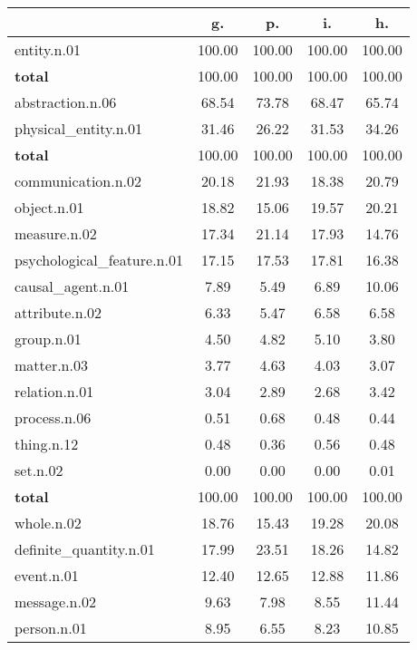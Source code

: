 \begin{table}[h!]
\begin{center}
\begin{tabular}{| l || c | c | c | c |}\hline
 & {\bf g.} & {\bf p.} & {\bf i.} & {\bf h.} \\\hline\hline
entity.n.01 & 100.00  & 100.00  & 100.00  & 100.00 \\\hline\hline
{{\bf total}} & 100.00  & 100.00  & 100.00  & 100.00 \\\hline\hline\hline
abstraction.n.06 & 68.54  & 73.78  & 68.47  & 65.74 \\\hline
physical\_entity.n.01 & 31.46  & 26.22  & 31.53  & 34.26 \\\hline\hline
{{\bf total}} & 100.00  & 100.00  & 100.00  & 100.00 \\\hline\hline\hline
communication.n.02 & 20.18  & 21.93  & 18.38  & 20.79 \\\hline
object.n.01 & 18.82  & 15.06  & 19.57  & 20.21 \\\hline
measure.n.02 & 17.34  & 21.14  & 17.93  & 14.76 \\\hline
psychological\_feature.n.01 & 17.15  & 17.53  & 17.81  & 16.38 \\\hline
causal\_agent.n.01 & 7.89  & 5.49  & 6.89  & 10.06 \\\hline
attribute.n.02 & 6.33  & 5.47  & 6.58  & 6.58 \\\hline
group.n.01 & 4.50  & 4.82  & 5.10  & 3.80 \\\hline
matter.n.03 & 3.77  & 4.63  & 4.03  & 3.07 \\\hline
relation.n.01 & 3.04  & 2.89  & 2.68  & 3.42 \\\hline
process.n.06 & 0.51  & 0.68  & 0.48  & 0.44 \\\hline
thing.n.12 & 0.48  & 0.36  & 0.56  & 0.48 \\\hline
set.n.02 & 0.00  & 0.00  & 0.00  & 0.01 \\\hline\hline
{{\bf total}} & 100.00  & 100.00  & 100.00  & 100.00 \\\hline\hline\hline
whole.n.02 & 18.76  & 15.43  & 19.28  & 20.08 \\\hline
definite\_quantity.n.01 & 17.99  & 23.51  & 18.26  & 14.82 \\\hline
event.n.01 & 12.40  & 12.65  & 12.88  & 11.86 \\\hline
message.n.02 & 9.63  & 7.98  & 8.55  & 11.44 \\\hline
person.n.01 & 8.95  & 6.55  & 8.23  & 10.85 \\\hline

\end{tabular}
\end{center}
\end{table}
